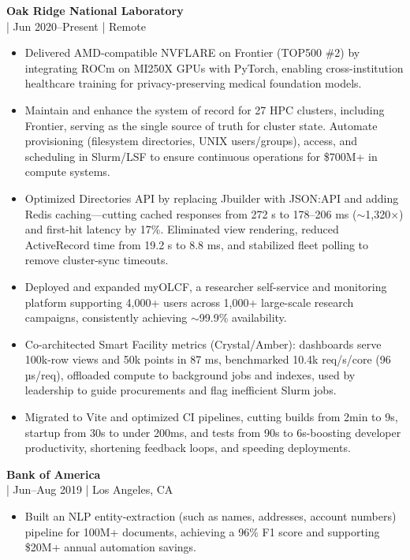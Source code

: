 \documentclass[11pt,a4paper]{article}
\newcommand{\regbullet}[1]{
    \item {\fontsize{10}{12}\selectfont #1}
}
\begin{document}
\noindent\textbf{Oak Ridge National Laboratory}\\
  |  {\fontsize{10}{12}\selectfont Jun 2020--Present}  |  {\fontsize{10}{12}\selectfont Remote}
\begin{itemize}[leftmargin=18pt,itemsep=1pt,topsep=0pt]
\regbullet{Delivered AMD-compatible NVFLARE on Frontier (TOP500 \#2) by integrating ROCm on MI250X GPUs with PyTorch, enabling cross-institution healthcare training for privacy-preserving medical foundation models.}

\regbullet{Maintain and enhance the system of record for 27 HPC clusters, including Frontier, serving as the single source of truth for cluster state. Automate provisioning (filesystem directories, UNIX users/groups), access, and scheduling in Slurm/LSF to ensure continuous operations for \$700M+ in compute systems.}

\regbullet{Optimized Directories API by replacing Jbuilder with JSON:API and adding Redis caching—cutting cached responses from 272 s to 178--206 ms ($\sim$1,320$\times$) and first-hit latency by 17\%. Eliminated view rendering, reduced ActiveRecord time from 19.2 s to 8.8 ms, and stabilized fleet polling to remove cluster-sync timeouts.}

\regbullet{Deployed and expanded myOLCF, a researcher self-service and monitoring platform supporting 4,000+ users across 1,000+ large-scale research campaigns, consistently achieving $\sim$99.9\% availability.}

\regbullet{Co-architected Smart Facility metrics (Crystal/Amber): dashboards serve 100k-row views and 50k points in 87 ms, benchmarked 10.4k req/s/core (96 µs/req), offloaded compute to background jobs and indexes, used by leadership to guide procurements and flag inefficient Slurm jobs.}

\regbullet{Migrated to Vite and optimized CI pipelines, cutting builds from 2min to 9s, startup from 30s to under 200ms, and tests from 90s to 6s-boosting developer productivity, shortening feedback loops, and speeding deployments.}

\end{itemize}

\vspace{8pt}
\noindent\textbf{Bank of America}\\
  |  {\fontsize{10}{12}\selectfont Jun--Aug 2019}  |  {\fontsize{10}{12}\selectfont Los Angeles, CA}
\begin{itemize}[leftmargin=18pt,itemsep=1pt,topsep=0pt]
\regbullet{Built an NLP entity-extraction (such as names, addresses, account numbers) pipeline for 100M+ documents, achieving a 96\% F1 score and supporting \$20M+ annual automation savings.}
\end{itemize}
\end{document}
